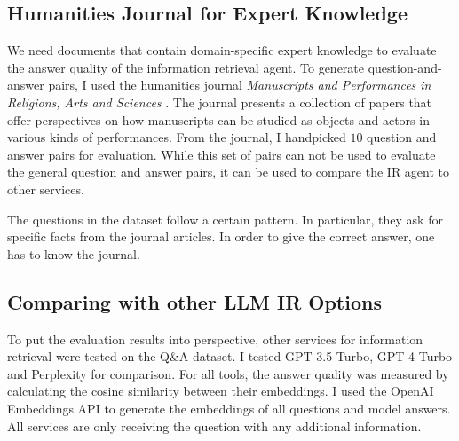 \documentclass[../main.tex]{subfiles}
\begin{document}
\subsection{Humanities Journal for Expert Knowledge}


We need documents that contain domain-specific expert knowledge
to evaluate the answer quality of the information retrieval agent.
To generate question-and-answer pairs,
I used the humanities journal
\emph{Manuscripts and Performances in Religions, Arts and Sciences} \cite{Brita2023}.
The journal presents a collection of papers that offer perspectives on how
manuscripts can be studied as objects and actors in various kinds of performances.
From the journal, I handpicked $10$ question and answer pairs for evaluation.
While this set of pairs can not be used to evaluate the general question and answer pairs,
it can be used to compare the IR agent to other services.

The questions in the dataset follow a certain pattern.
In particular, they ask for specific facts from the journal articles.
In order to give the correct answer, one has to know the journal.

\subsection{Comparing with other LLM IR Options}

To put the evaluation results into perspective,
other services for information retrieval were tested on the Q&A dataset.
I tested GPT-3.5-Turbo, GPT-4-Turbo and Perplexity for comparison.
For all tools, the answer quality was measured
by calculating the cosine similarity between their embeddings.
I used the OpenAI Embeddings API \cite{zotero-253} to generate the embeddings of all questions and model answers.
All services are only receiving the question with any additional information.
\end{document}
